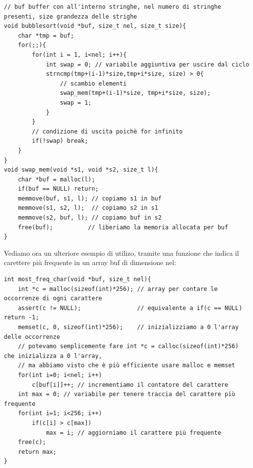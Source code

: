 \begin{verbatim}
// buf buffer con all'interno stringhe, nel numero di stringhe presenti, size grandezza delle strighe
void bubblesort(void *buf, size_t nel, size_t size){
    char *tmp = buf;
    for(;;){
        for(int i = 1, i<nel; i++){
            int swap = 0; // variabile aggiuntiva per uscire dal ciclo
            strncmp(tmp+(i-1)*size,tmp+i*size, size) > 0{
                // scambio elementi
                swap_mem(tmp+(i-1)*size, tmp+i*size, size);
                swap = 1;
            }
        }
        // condizione di uscita poichè for infinito
        if(!swap) break;
    }
}
void swap_mem(void *s1, void *s2, size_t l){
    char *buf = malloc(l);
    if(buf == NULL) return;
    memmove(buf, s1, l); // copiamo s1 in buf
    memmove(s1, s2, l);  // copiamo s2 in s1
    memmove(s2, buf, l); // copiamo buf in s2
    free(buf);          // liberiamo la memoria allocata per buf
}
\end{verbatim}
Vediamo ora un ulteriore esempio di utilizo, tramite una funzione che indica il carettere
più frequente in un array buf di dimensione nel:
\begin{verbatim}
int most_freq_char(void *buf, size_t nel){
    int *c = malloc(sizeof(int)*256); // array per contare le occorrenze di ogni carattere
    assert(c != NULL);                // equivalente a if(c == NULL) return -1;
    memset(c, 0, sizeof(int)*256);    // inizializziamo a 0 l'array delle occorrenze
    // potevamo semplicemente fare int *c = calloc(sizeof(int)*256) che inizializza a 0 l'array, 
    // ma abbiamo visto che è più efficiente usare malloc e memset
    for(int i=0; i<nel; i++)
        c[buf[i]]++; // incrementiamo il contatore del carattere
    int max = 0; // variabile per tenere traccia del carattere più frequente
    for(int i=1; i<256; i++)
        if(c[i] > c[max]) 
            max = i; // aggiorniamo il carattere più frequente
    free(c); 
    return max; 
}
\end{verbatim}
